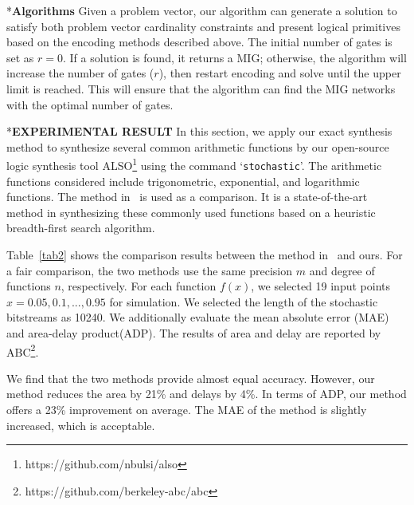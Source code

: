 \documentclass[conference,letterpaper]{IEEEtran}
\makeatletter
\renewcommand{\section}{\@startsection{section}{1}{0mm}
    {-\baselineskip}{0.001\baselineskip}{\bf\leftline}}
\renewcommand{\subsection}{\@startsection{subsection}{1}{0mm}
	{-\baselineskip}{0.001\baselineskip}{\bf\leftline}}
\makeatother
\begin{document}
\subsection*{\textbf{Algorithms }}
Given a problem vector, our algorithm can generate a solution to satisfy both problem vector cardinality constraints and present logical primitives based on the encoding methods described above. The initial number of gates is set as $r=0$. If a solution is found, it returns a MIG; otherwise, the algorithm will increase the number of gates ($r$), then restart encoding and solve until the upper limit is reached. This will ensure that the algorithm can find the MIG networks with the optimal number of gates.

\section*{\textbf{\large EXPERIMENTAL RESULT}}
In this section, we apply our exact synthesis method to synthesize several common arithmetic functions by our open-source logic synthesis tool ALSO\footnote{https://github.com/nbulsi/also} using the command `\texttt{stochastic}'. The arithmetic functions considered include trigonometric, exponential, and logarithmic functions. The method in~\cite{Cube-Assignment} is used as a comparison. It is a state-of-the-art method in synthesizing these commonly used functions based on a heuristic breadth-first search algorithm. 

Table~\ref{tab2} shows the comparison results between the method in~\cite{Cube-Assignment} and ours. For a fair comparison, the two methods use the same precision $m$ and degree of functions $n$, respectively. For each function $f(x)$, we selected 19 input points $x=0.05, 0.1,..., 0.95$ for simulation. We selected the length of the stochastic bitstreams as 10240. We additionally evaluate the mean absolute error (MAE) and area-delay product(ADP). 
The results of area and delay are reported by ABC\footnote{https://github.com/berkeley-abc/abc}.

We find that the two methods provide almost equal accuracy. However, our method reduces the area  by 21\% and delays by 4\%. In terms of ADP, our method offers a 23\% improvement on average. The MAE of the method is slightly increased, which is acceptable.
\end{document}
